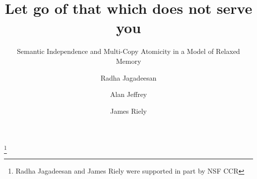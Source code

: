 \documentclass[sigplan,10pt,
review,anonymous,
]{acmart}
\theoremstyle{acmdefinition}
\begin{document}
\title{Let go of that which does not serve you}
\subtitle{Semantic Independence and Multi-Copy Atomicity in a Model of Relaxed Memory}





\author{Radha Jagadeesan}

\author{Alan Jeffrey}

\author{James Riely}


\thanks{Radha Jagadeesan and James Riely were supported in part by NSF CCR}
\end{document}
